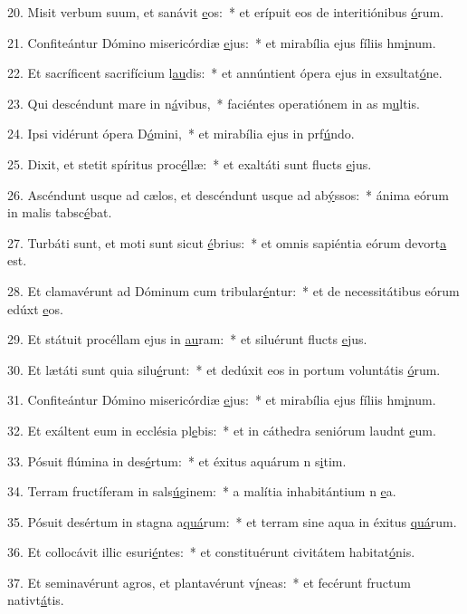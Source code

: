 20. Misit verbum suum, et sanávit \uline{e}os:~* et erípuit eos de interitiónibus \uline{ó}rum.\par 
21. Confiteántur Dómino misericórdiæ \uline{e}jus:~* et mirabília ejus fíliis hm\uline{i}num.\par 
22. Et sacríficent sacrifícium l\uline{au}dis:~* et annúntient ópera ejus in exsultat\uline{ó}ne.\par 
23. Qui descéndunt mare in n\uline{á}vibus,~* faciéntes operatiónem in as m\uline{u}ltis.\par 
24. Ipsi vidérunt ópera D\uline{ó}mini,~* et mirabília ejus in prf\uline{ú}ndo.\par 
25. Dixit, et stetit spíritus proc\uline{é}llæ:~* et exaltáti sunt flucts \uline{e}jus.\par 
26. Ascéndunt usque ad cælos, et descéndunt usque ad ab\uline{ý}ssos:~* ánima eórum in malis tabsc\uline{é}bat.\par 
27. Turbáti sunt, et moti sunt sicut \uline{é}brius:~* et omnis sapiéntia eórum devort\uline{a} est.\par 
28. Et clamavérunt ad Dóminum cum tribular\uline{é}ntur:~* et de necessitátibus eórum edúxt \uline{e}os.\par 
29. Et státuit procéllam ejus in \uline{au}ram:~* et siluérunt flucts \uline{e}jus.\par 
30. Et lætáti sunt quia silu\uline{é}runt:~* et dedúxit eos in portum voluntátis \uline{ó}rum.\par 
31. Confiteántur Dómino misericórdiæ \uline{e}jus:~* et mirabília ejus fíliis hm\uline{i}num.\par 
32. Et exáltent eum in ecclésia pl\uline{e}bis:~* et in cáthedra seniórum laudnt \uline{e}um.\par 
33. Pósuit flúmina in des\uline{é}rtum:~* et éxitus aquárum n s\uline{i}tim.\par 
34. Terram fructíferam in sals\uline{ú}ginem:~* a malítia inhabitántium n \uline{e}a.\par 
35. Pósuit desértum in stagna a\uline{quá}rum:~* et terram sine aqua in éxitus \uline{quá}rum.\par 
36. Et collocávit illic esuri\uline{é}ntes:~* et constituérunt civitátem habitat\uline{ó}nis.\par 
37. Et seminavérunt agros, et plantavérunt v\uline{í}neas:~* et fecérunt fructum nativt\uline{á}tis.\par 

